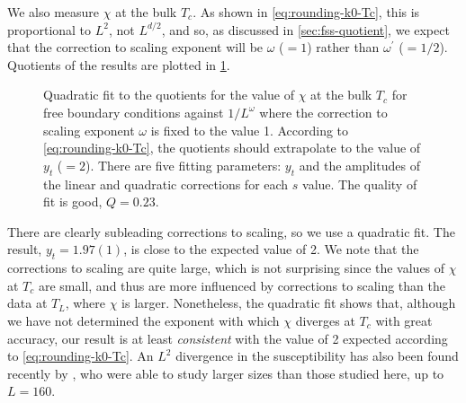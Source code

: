 We also measure $\chi$ at the bulk $T_c$. As shown in \cref{eq:rounding-k0-Tc},
this is proportional to $L^2$, not $L^{d/2}$, and so, as discussed in
\cref{sec:fss-quotient}, we expect that the correction to scaling exponent will
be $\omega$ ($=1$) rather than $\omega^{\prime}$ ($=1/2$). Quotients of the
results are plotted in
\cref{fig:qchiTc}.
\begin{figure}
  \centering
  
  \caption[
    Quotient estimation of the width exponent $y_t$ for $\vec{k}\neq\vec{0}$
    modes of the five-dimensional Ising model with free boundary conditions.
  ]
  {
    Quadratic fit to the quotients for the value of $\chi$ at the bulk $T_c$
    for free boundary conditions against $1/L^{\omega}$ where the correction
    to scaling exponent $\omega$ is fixed to the value 1.
    According to \cref{eq:rounding-k0-Tc}, the quotients should extrapolate
    to the value of $y_t$ ($=2$). There are five fitting parameters:
    $y_t$ and the amplitudes of the linear and quadratic corrections for
    each $s$ value. The quality of fit is good, $Q=0.23$.
  }
  \label{fig:qchiTc}
\end{figure}
There are clearly subleading corrections to scaling, so we use a quadratic fit.
The result, $y_t=1.97(1)$, is close to the expected value of 2. We note that
the corrections to scaling are quite large, which is not surprising since the
values of $\chi$ at $T_c$ are small, and thus are more influenced by
corrections to scaling than the data at $T_L$, where $\chi$ is larger.
Nonetheless, the quadratic fit shows that, although we have not determined the
exponent with which $\chi$ diverges at $T_c$ with great accuracy, our result is
at least \emph{consistent} with the value of 2 expected according to
\cref{eq:rounding-k0-Tc}. An $L^2$ divergence in the susceptibility has also
been found recently by \textcite{lundow2014finite}, who were able to study
larger sizes than those studied here, up to $L=160$.

